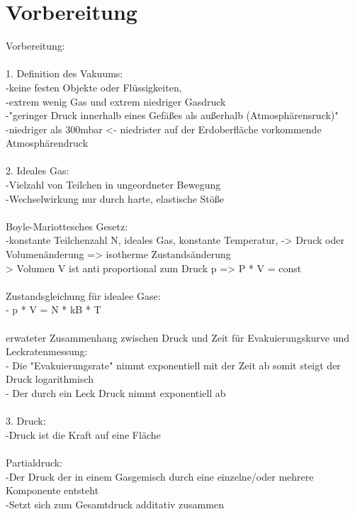 \section{Vorbereitung}      
Vorbereitung: \\
\\
	1. Definition des Vakuums:\\
		-keine festen Objekte oder Flüssigkeiten,\\
                -extrem wenig Gas und extrem niedriger Gasdruck\\
                -"geringer Druck innerhalb eines Gefäßes als außerhalb (Atmosphärensruck)"\\
                -niedriger als 300mbar <- niedrister auf der Erdoberfläche vorkommende Atmosphärendruck\\
\\
	2. Ideales Gas:\\
		-Vielzahl von Teilchen in ungeordneter Bewegung\\
		-Wechselwirkung nur durch harte, elastische Stöße\\
\\
	   Boyle-Mariottesches Gesetz:\\
		-konstante Teilchenzahl N, ideales Gas, konstante Temperatur, -> Druck oder Volumenänderung => isotherme Zustandsänderung\\
		 \-> Volumen V ist anti proportional zum Druck p => P * V = const \\
\\
	   Zustandsgleichung für idealee Gase:\\
		- p * V = N * kB * T\\
\\
	   erwateter Zusammenhang zwischen Druck und Zeit für Evakuierungskurve und Leckratenmessung:\\
	   	- Die "Evakuierungsrate" nimmt exponentiell mit der Zeit ab somit steigt der Druck logarithmisch\\
		- Der durch ein Leck Druck nimmt exponentiell ab\\
\\
	3. Druck:\\
		-Druck ist die Kraft auf eine Fläche\\
\\
	   Partialdruck:\\
	   	-Der Druck der in einem Gasgemisch durch eine einzelne/oder mehrere Komponente entsteht\\
		-Setzt sich zum Gesamtdruck additativ zusammen\\
